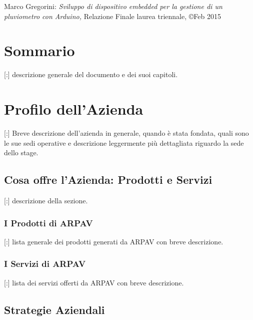 \documentclass[11pt]{book}              %
\begin{document}
\newpage
\thispagestyle{empty}
\vspace*{\fill}

Marco Gregorini: \textit{Sviluppo di dispositivo embedded per la gestione di un pluviometro con Arduino,} Relazione Finale laurea triennale, \copyright Feb 2015

\newpage

\chapter{Sommario}
[:] descrizione generale del documento e dei suoi capitoli.
                          

\newpage
\thispagestyle{empty}

\tableofcontents    

\newpage
\thispagestyle{empty}

                  
\mainmatter       
  

\chapter{Profilo dell'Azienda}

\thispagestyle{fancy} 

[:] Breve descrizione dell'azienda in generale, quando è stata fondata, quali sono le sue sedi operative e descrizione leggermente più dettagliata riguardo la sede dello stage.

\section{Cosa offre l'Azienda: Prodotti e Servizi}

[:] descrizione della sezione.

\subsection{I Prodotti di ARPAV}

[:] lista generale dei prodotti generati da ARPAV con breve descrizione.

\subsection{I Servizi di ARPAV}

[:] lista dei servizi offerti da ARPAV con breve descrizione.

\section{Strategie Aziendali}
\end{document}
